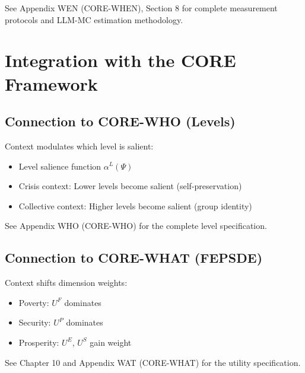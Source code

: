 \begin{cross-reference}
See Appendix WEN (CORE-WHEN), Section 8 for complete measurement protocols
and LLM-MC estimation methodology.
\end{cross-reference}



\section{Integration with the CORE Framework}
\label{sec:context-integration}


\subsection{Connection to CORE-WHO (Levels)}

\begin{cross-reference}
Context modulates which level is salient:
\begin{itemize}[nosep]
  \item Level salience function $\alpha^L(\Psi)$
  \item Crisis context: Lower levels become salient (self-preservation)
  \item Collective context: Higher levels become salient (group identity)
\end{itemize}
See Appendix WHO (CORE-WHO) for the complete level specification.
\end{cross-reference}

\subsection{Connection to CORE-WHAT (FEPSDE)}

\begin{cross-reference}
Context shifts dimension weights:
\begin{itemize}[nosep]
  \item Poverty: $U^F$ dominates
  \item Security: $U^P$ dominates
  \item Prosperity: $U^E$, $U^S$ gain weight
\end{itemize}
See Chapter 10 and Appendix WAT (CORE-WHAT) for the utility specification.
\end{cross-reference}

